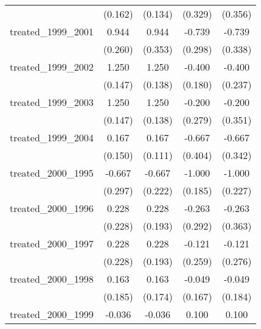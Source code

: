 {\begin{tabular}{l*{4}{c}}
            &     (0.162)         &     (0.134)         &     (0.329)         &     (0.356)         \\
[1em]
treated\_1999\_2001&       0.944\sym{***}&       0.944\sym{**} &      -0.739\sym{*}  &      -0.739\sym{*}  \\
            &     (0.260)         &     (0.353)         &     (0.298)         &     (0.338)         \\
[1em]
treated\_1999\_2002&       1.250\sym{***}&       1.250\sym{***}&      -0.400\sym{*}  &      -0.400         \\
            &     (0.147)         &     (0.138)         &     (0.180)         &     (0.237)         \\
[1em]
treated\_1999\_2003&       1.250\sym{***}&       1.250\sym{***}&      -0.200         &      -0.200         \\
            &     (0.147)         &     (0.138)         &     (0.279)         &     (0.351)         \\
[1em]
treated\_1999\_2004&       0.167         &       0.167         &      -0.667         &      -0.667         \\
            &     (0.150)         &     (0.111)         &     (0.404)         &     (0.342)         \\
[1em]
treated\_2000\_1995&      -0.667\sym{*}  &      -0.667\sym{**} &      -1.000\sym{***}&      -1.000\sym{***}\\
            &     (0.297)         &     (0.222)         &     (0.185)         &     (0.227)         \\
[1em]
treated\_2000\_1996&       0.228         &       0.228         &      -0.263         &      -0.263         \\
            &     (0.228)         &     (0.193)         &     (0.292)         &     (0.363)         \\
[1em]
treated\_2000\_1997&       0.228         &       0.228         &      -0.121         &      -0.121         \\
            &     (0.228)         &     (0.193)         &     (0.259)         &     (0.276)         \\
[1em]
treated\_2000\_1998&       0.163         &       0.163         &      -0.049         &      -0.049         \\
            &     (0.185)         &     (0.174)         &     (0.167)         &     (0.184)         \\
[1em]
treated\_2000\_1999&      -0.036         &      -0.036         &       0.100         &       0.100         \\

\end{tabular}}

